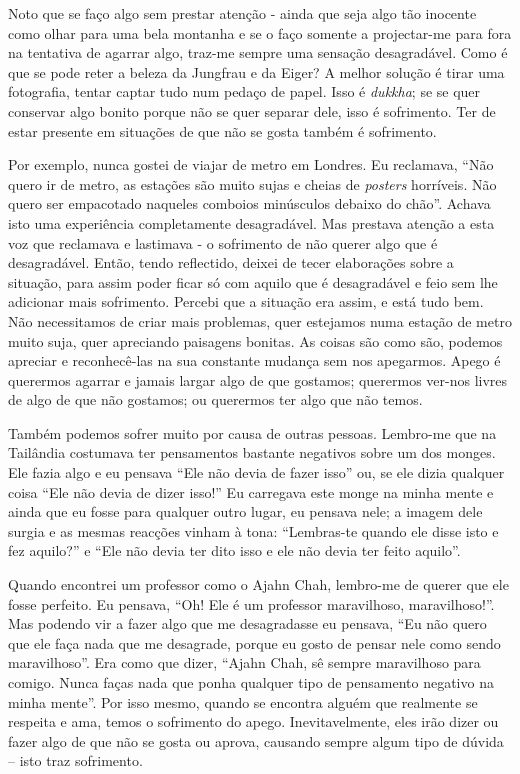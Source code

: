 Noto que se faço algo sem prestar atenção - ainda que seja algo tão inocente
como olhar para uma bela montanha e se o faço somente a projectar-me para fora
na tentativa de agarrar algo, traz-me sempre uma sensação desagradável. Como é
que se pode reter a beleza da Jungfrau e da Eiger? A melhor solução é tirar uma
fotografia, tentar captar tudo num pedaço de papel. Isso é \emph{dukkha}; se se
quer conservar algo bonito porque não se quer separar dele, isso é sofrimento.
Ter de estar presente em situações de que não se gosta também é sofrimento.

Por exemplo, nunca gostei de viajar de metro em Londres. Eu reclamava, “Não
quero ir de metro, as estações são muito sujas e cheias de \emph{posters}
horríveis. Não quero ser empacotado naqueles comboios minúsculos debaixo do
chão”. Achava isto uma experiência completamente desagradável. Mas prestava
atenção a esta voz que reclamava e lastimava - o sofrimento de não querer algo
que é desagradável. Então, tendo reflectido, deixei de tecer elaborações sobre a
situação, para assim poder ficar só com aquilo que é desagradável e feio sem lhe
adicionar mais sofrimento. Percebi que a situação era assim, e está tudo bem.
Não necessitamos de criar mais problemas, quer estejamos numa estação de metro
muito suja, quer apreciando paisagens bonitas. As coisas são como são, podemos
apreciar e reconhecê-las na sua constante mudança sem nos apegarmos. Apego é
querermos agarrar e jamais largar algo de que gostamos; querermos ver-nos livres
de algo de que não gostamos; ou querermos ter algo que não temos.

Também podemos sofrer muito por causa de outras pessoas. Lembro-me que na
Tailândia costumava ter pensamentos bastante negativos sobre um dos monges. Ele
fazia algo e eu pensava “Ele não devia de fazer isso” ou, se ele dizia qualquer
coisa “Ele não devia de dizer isso!” Eu carregava este monge na minha mente e
ainda que eu fosse para qualquer outro lugar, eu pensava nele; a imagem dele
surgia e as mesmas reacções vinham à tona: “Lembras-te quando ele disse isto e
fez aquilo?” e “Ele não devia ter dito isso e ele não devia ter feito aquilo”.

Quando encontrei um professor como o Ajahn Chah, lembro-me de querer que ele
fosse perfeito. Eu pensava, “Oh! Ele é um professor maravilhoso, maravilhoso!”.
Mas podendo vir a fazer algo que me desagradasse eu pensava, “Eu não quero que
ele faça nada que me desagrade, porque eu gosto de pensar nele como sendo
maravilhoso”. Era como que dizer, “Ajahn Chah, sê sempre maravilhoso para
comigo. Nunca faças nada que ponha qualquer tipo de pensamento negativo na minha
mente”. Por isso mesmo, quando se encontra alguém que realmente se respeita e
ama, temos o sofrimento do apego. Inevitavelmente, eles irão dizer ou fazer algo
de que não se gosta ou aprova, causando sempre algum tipo de dúvida – isto traz
sofrimento.

